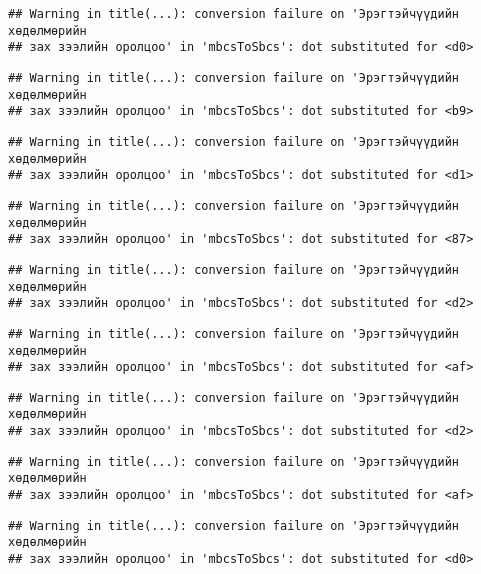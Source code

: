 \documentclass[]{article}
\begin{document}
\begin{verbatim}
## Warning in title(...): conversion failure on 'Эрэгтэйчүүдийн хөдөлмөрийн
## зах зээлийн оролцоо' in 'mbcsToSbcs': dot substituted for <d0>
\end{verbatim}

\begin{verbatim}
## Warning in title(...): conversion failure on 'Эрэгтэйчүүдийн хөдөлмөрийн
## зах зээлийн оролцоо' in 'mbcsToSbcs': dot substituted for <b9>
\end{verbatim}

\begin{verbatim}
## Warning in title(...): conversion failure on 'Эрэгтэйчүүдийн хөдөлмөрийн
## зах зээлийн оролцоо' in 'mbcsToSbcs': dot substituted for <d1>
\end{verbatim}

\begin{verbatim}
## Warning in title(...): conversion failure on 'Эрэгтэйчүүдийн хөдөлмөрийн
## зах зээлийн оролцоо' in 'mbcsToSbcs': dot substituted for <87>
\end{verbatim}

\begin{verbatim}
## Warning in title(...): conversion failure on 'Эрэгтэйчүүдийн хөдөлмөрийн
## зах зээлийн оролцоо' in 'mbcsToSbcs': dot substituted for <d2>
\end{verbatim}

\begin{verbatim}
## Warning in title(...): conversion failure on 'Эрэгтэйчүүдийн хөдөлмөрийн
## зах зээлийн оролцоо' in 'mbcsToSbcs': dot substituted for <af>
\end{verbatim}

\begin{verbatim}
## Warning in title(...): conversion failure on 'Эрэгтэйчүүдийн хөдөлмөрийн
## зах зээлийн оролцоо' in 'mbcsToSbcs': dot substituted for <d2>
\end{verbatim}

\begin{verbatim}
## Warning in title(...): conversion failure on 'Эрэгтэйчүүдийн хөдөлмөрийн
## зах зээлийн оролцоо' in 'mbcsToSbcs': dot substituted for <af>
\end{verbatim}

\begin{verbatim}
## Warning in title(...): conversion failure on 'Эрэгтэйчүүдийн хөдөлмөрийн
## зах зээлийн оролцоо' in 'mbcsToSbcs': dot substituted for <d0>
\end{verbatim}
\end{document}
